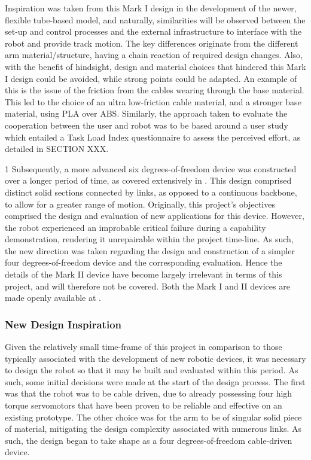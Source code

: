 \documentclass[11pt]{article}
\begin{document}
Inspiration was taken from this Mark I design in the development of the newer, flexible tube-based model, and naturally, similarities will be observed between the set-up and control processes and the external infrastructure to interface with the robot and provide track motion. The key differences originate from the different arm material/structure, having a chain reaction of required design changes. Also, with the benefit of hindsight, design and material choices that hindered this Mark I design could be avoided, while strong points could be adapted. An example of this is the issue of the friction from the cables wearing through the base material. This led to the choice of an ultra low-friction cable material, and a stronger base material, using PLA over ABS. Similarly, the approach taken to evaluate the cooperation between the user and robot was to be based around a user study which entailed a Task Load Index questionnaire to assess the perceived effort, as detailed in SECTION XXX.

1
Subsequently, a more advanced six degrees-of-freedom device was constructed over a longer period of time, as covered extensively in \cite{GreggSmithKinematics}. This design comprised distinct solid sections connected by links, as opposed to a continuous backbone, to allow for a greater range of motion. Originally, this project's objectives comprised the design and evaluation of new applications for this device. However, the robot experienced an improbable critical failure during a capability demonstration, rendering it unrepairable within the project time-line. As such, the new direction was taken regarding the design and construction of a simpler four degrees-of-freedom device and the corresponding evaluation. Hence the details of the Mark II device have become largely irrelevant in terms of this project, and will therefore not be covered. Both the Mark I and II devices are made openly available at \cite{handheldrobotics}.

\subsubsection{New Design Inspiration}

Given the relatively small time-frame of this project in comparison to those typically associated with the development of new robotic devices, it was necessary to design the robot so that it may be built and evaluated within this period. As such, some initial decisions were made at the start of the design process. The first was that the robot was to be cable driven, due to already possessing four high torque servomotors that have been proven to be reliable and effective on an existing prototype. The other choice was for the arm to be of singular solid piece of material, mitigating the design complexity associated with numerous links. As such, the design began to take shape as a four degrees-of-freedom cable-driven device. 
\end{document}
